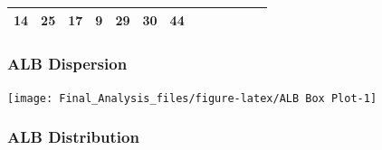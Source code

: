 \begin{longtable}[]{@{}lcccccccccccc@{}}
\begin{minipage}[t]{0.04\columnwidth}
14\strut
\end{minipage} & \begin{minipage}[t]{0.04\columnwidth}\centering\strut
25\strut
\end{minipage} & \begin{minipage}[t]{0.04\columnwidth}\centering\strut
17\strut
\end{minipage} & \begin{minipage}[t]{0.04\columnwidth}\centering\strut
9\strut
\end{minipage} & \begin{minipage}[t]{0.04\columnwidth}\centering\strut
29\strut
\end{minipage} & \begin{minipage}[t]{0.04\columnwidth}\centering\strut
30\strut
\end{minipage} & \begin{minipage}[t]{0.04\columnwidth}\centering\strut
44\strut
\end{minipage}\tabularnewline
\bottomrule
\end{longtable}

\subsubsection{ALB Dispersion}\label{alb-dispersion}

\begin{Shaded}
\begin{Highlighting}[]
\NormalTok{(ALB[,}\NormalTok{:}\NormalTok{], }\NormalTok{(}\NormalTok{), }\NormalTok{)}
\end{Highlighting}
\end{Shaded}

\begin{center}\texttt{[image: Final\_Analysis\_files/figure-latex/ALB Box Plot-1]} \end{center}

\subsubsection{ALB Distribution}\label{alb-distribution}

\begin{Shaded}
\begin{Highlighting}[]
\NormalTok{(}\NormalTok{(}\NormalTok{,}\NormalTok{))}
\NormalTok{, }\NormalTok{)}
\NormalTok{, }\NormalTok{)}
\end{Highlighting}
\end{Shaded}

